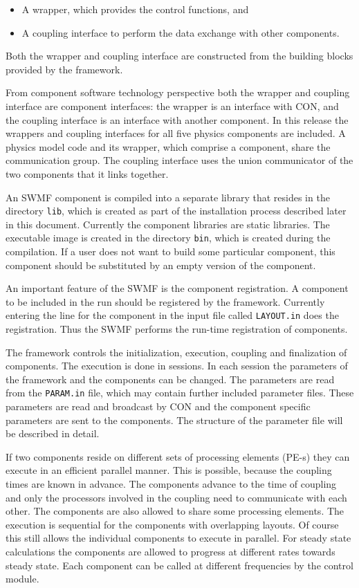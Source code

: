 \begin{itemize}
\item A wrapper, which provides the control functions, and
\item A coupling interface to perform the data exchange with other
components.
\end{itemize}

Both the wrapper and coupling interface are constructed from the
building blocks provided by the framework.

From component software technology perspective both the wrapper and
coupling interface are component interfaces: the wrapper is an
interface with CON, and the coupling interface is an interface with
another component. In this release the wrappers and coupling
interfaces for all five physics components are included. A physics
model code and its wrapper, which comprise a component, share the
communication group.  The coupling interface uses the union
communicator of the two components that it links together.

An SWMF component is compiled into a separate library that resides in
the directory {\tt lib}, which is created as part of the installation
process described later in this document.  Currently the component
libraries are static libraries. The executable image is created in the
directory {\tt bin}, which is created during the compilation.  If a
user does not want to build some particular component, this component
should be substituted by an empty version of the component.

An important feature of the SWMF is the component registration.  A
component to be included in the run should be registered by the
framework.  Currently entering the line for the component in the input
file called {\tt LAYOUT.in} does the registration.  Thus the SWMF
performs the run-time registration of components.

The framework controls the initialization, execution, coupling and
finalization of components.  The execution is done in sessions. In
each session the parameters of the framework and the components can be
changed.  The parameters are read from the {\tt PARAM.in} file, which
may contain further included parameter files.  These parameters are
read and broadcast by CON and the component specific parameters are
sent to the components. The structure of the parameter file will be
described in detail.

If two components reside on different sets of processing elements
(PE-s) they can execute in an efficient parallel manner.
This is possible, because the coupling times are
known in advance.  The components advance to the time of coupling and
only the processors involved in the coupling need to communicate with
each other. The components are also allowed to share some processing elements.
The execution is sequential for the components with overlapping layouts.
Of course this still allows the individual components to execute in parallel.
For steady state calculations the components are allowed to progress
at different rates towards steady state. Each component can be called
at different frequencies by the control module.

